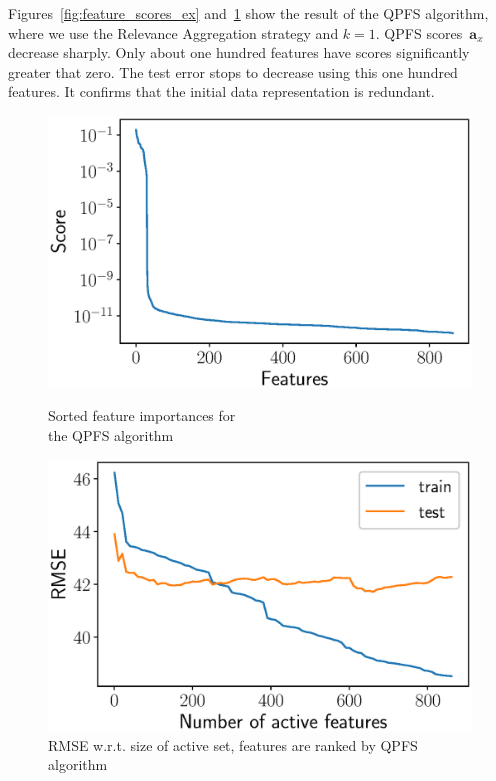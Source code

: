 \documentclass[12pt,twoside]{article}
\theoremstyle{definition}
\newcommand{\ba}{\mathbf{a}}
\begin{document}
Figures~\ref{fig:feature_scores_ex} and~\ref{fig:train_test_qpfs} show the result of the QPFS algorithm, where we use the Relevance Aggregation strategy and $k = 1$.
QPFS scores~$\ba_x$ decrease sharply.
Only about one hundred features have scores significantly greater that zero.
The test error stops to decrease using this one hundred features.
It confirms that the initial data representation is redundant.
\begin{figure}
	\begin{minipage}{.5\linewidth}
		\centering
		\includegraphics[width=\linewidth]{figs/feature_scores_ex.eps}
		\caption{Sorted feature importances for \\ the QPFS algorithm}
		\label{fig:feature_scores_ex}
	\end{minipage}%
	\begin{minipage}{.5\linewidth}
	\centering
	\includegraphics[width=\linewidth]{figs/train_test_qpfs.eps}
	\caption{RMSE w.r.t. size of active set, features are ranked by QPFS algorithm}
	\label{fig:train_test_qpfs}
	\end{minipage}
\end{figure}
\end{document}
